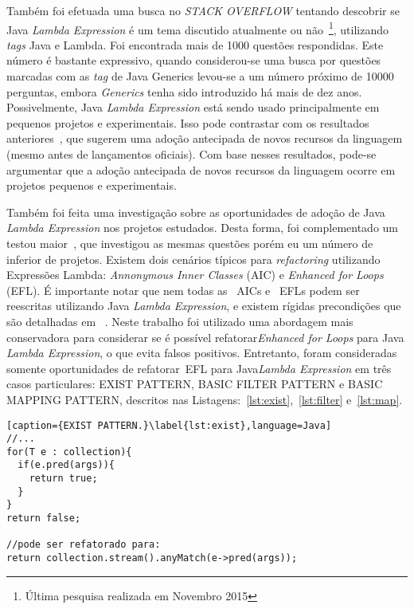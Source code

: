 Também foi efetuada uma busca no \textit{STACK OVERFLOW} tentando descobrir se Java\textit{ Lambda Expression} é um tema discutido atualmente ou não~\footnote{Última pesquisa realizada em Novembro 2015}, utilizando \textit{tags} Java e Lambda. Foi encontrada mais de \num{1000} questões respondidas. Este número é bastante expressivo, quando considerou-se uma busca por questões marcadas com as \textit{tag} de Java Generics levou-se a um número próximo de \num{10000} perguntas, embora \textit{Generics} tenha sido introduzido há mais de dez anos. Possivelmente, Java\textit{ Lambda Expression} está sendo usado principalmente em pequenos projetos e experimentais. Isso pode contrastar com os resultados anteriores~\cite{Dyer:ACM2014}, que sugerem uma adoção antecipada de novos recursos da linguagem (mesmo antes de lançamentos oficiais). Com base nesses resultados, pode-se argumentar que a adoção antecipada de novos recursos da linguagem ocorre em projetos pequenos e experimentais.

Tamb\'{e}m foi feita uma investiga\c c\~{a}o sobre as oportunidades de adoção de Java\textit{ Lambda Expression} nos projetos estudados. Desta forma, foi complementado um testou maior~\cite{gyori2013crossing},  que investigou as mesmas questões porém eu um número de  inferior de projetos. Existem dois cenários típicos para \textit{refactoring} utilizando Expressões Lambda: \textit{Annonymous Inner Classes} (\acs{AIC}) e \textit{Enhanced for Loops} (\acs{EFL}). É importante notar que nem todas as ~\acs{AIC}s e ~\acs{EFL}s podem ser reescritas utilizando Java\textit{ Lambda Expression}, e existem rígidas precondições que são detalhadas em ~\cite{gyori2013crossing}. Neste trabalho foi utilizado uma abordagem mais conservadora para considerar se é possível refatorar\textit{Enhanced for Loops} para Java\textit{ Lambda Expression}, o que evita falsos positivos.  Entretanto, foram consideradas somente 
oportunidades de refatorar~\acs{EFL} para Java\textit{Lambda Expression} em tr\^{e}s 
casos particulares: \textsc{EXIST PATTERN}, \textsc{BASIC FILTER PATTERN} e 
\textsc{BASIC MAPPING PATTERN}, descritos nas 
Listagens:~\ref{lst:exist},~\ref{lst:filter} e~\ref{lst:map}.

\begin{lstlisting}[caption={EXIST PATTERN.}\label{lst:exist},language=Java]
//...
for(T e : collection){
  if(e.pred(args)){
    return true;
  }
}
return false;

//pode ser refatorado para:
return collection.stream().anyMatch(e->pred(args));
\end{lstlisting}

